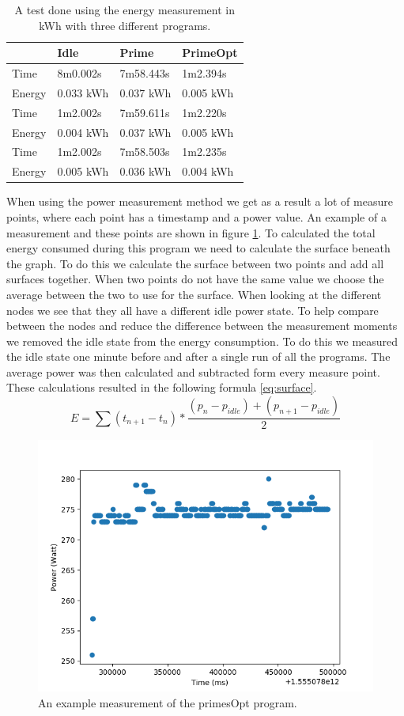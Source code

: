 \begin{table}[h]
\centering
\begin{tabular}{|l|l|l|l|}
\hline
       & \textbf{Idle}      & \textbf{Prime}     & \textbf{PrimeOpt}  \\ \hline
Time   & 8m0.002s  & 7m58.443s & 1m2.394s  \\
Energy & 0.033 kWh & 0.037 kWh & 0.005 kWh \\ \hline
Time   & 1m2.002s  & 7m59.611s & 1m2.220s  \\
Energy & 0.004 kWh & 0.037 kWh & 0.005 kWh \\ \hline
Time   & 1m2.002s  & 7m58.503s & 1m2.235s  \\
Energy & 0.005 kWh & 0.036 kWh & 0.004 kWh \\ \hline
\end{tabular}
\caption{A test done using the energy measurement in kWh with three different programs.}
\label{tab:EMmethod}
\end{table}

When using the power measurement method we get as a result a lot of measure points, where each point has a timestamp and a power value. An example of a measurement and these points are shown in figure \ref{fig:primesOpt}. To calculated the total energy consumed during this program we need to calculate the surface beneath the graph. To do this we calculate the surface between two points and add all surfaces together. When two points do not have the same value we choose the average between the two to use for the surface. When looking at the different nodes we see that they all have a different idle power state. To help compare between the nodes and reduce the difference between the measurement moments we removed the idle state from the energy consumption. To do this we measured the idle state one minute before and after a single run of all the programs. The average power was then calculated and subtracted form every measure point. These calculations resulted in the following formula \ref{eq:surface}.\\

\begin{equation} \label{eq:surface}
    E = \sum (t_{n+1} - t_{n}) * \frac{(p_{n} - p_{idle}) + (p_{n+1} - p_{idle})}{2}
\end{equation}

\begin{figure}[h]
    \centering
    \includegraphics[width=.4\textwidth]{graphs/primesOpt.png}
    \caption{An example measurement of the primesOpt program.}
    \label{fig:primesOpt}
\end{figure}

